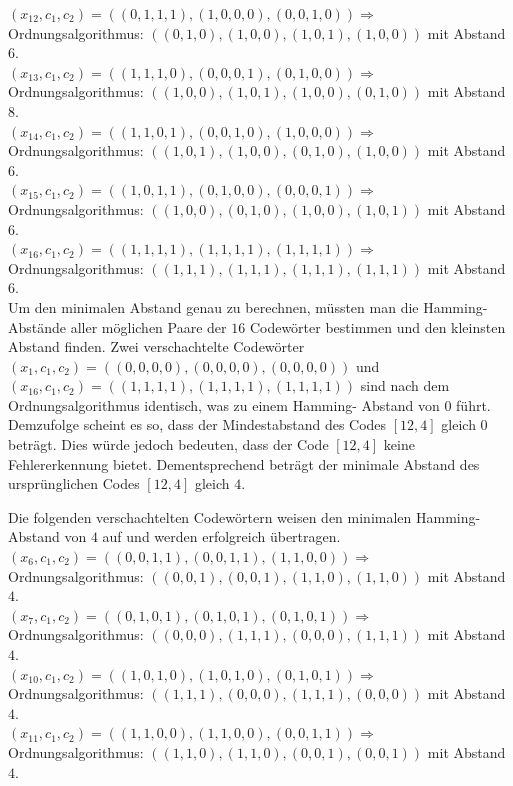 \begin{Beispiel}
    $(x_{12}, c_1, c_2) = ((0,1,1,1), (1,0,0,0), (0,0,1,0)) \Rightarrow$ Ordnungsalgorithmus: $((0,1,0),(1, 0,0),(1,0, 1),(1,0,0))$ mit Abstand $6$.\\
    
    $(x_{13}, c_1, c_2) = ((1,1,1,0), (0,0,0,1), (0,1,0,0)) \Rightarrow$ Ordnungsalgorithmus: $((1,0,0),(1, 0,1),(1,0, 0),(0,1,0))$ mit Abstand $8$.\\
    
    $(x_{14}, c_1, c_2) = ((1,1,0,1), (0,0,1,0), (1,0,0,0)) \Rightarrow$ Ordnungsalgorithmus: $((1,0,1),(1, 0,0),(0,1 ,0),(1,0,0))$ mit Abstand $6$.\\
    
    $(x_{15}, c_1, c_2) = ((1,0,1,1), (0,1,0,0), (0,0,0,1)) \Rightarrow$ Ordnungsalgorithmus: $((1,0,0),(0, 1,0),(1,0, 0),(1,0,1))$ mit Abstand $6$.\\
    
    $(x_{16}, c_1, c_2) = ((1,1,1,1), (1,1,1,1), (1,1,1,1)) \Rightarrow$ Ordnungsalgorithmus: $((1,1,1),(1, 1,1),(1,1, 1),(1,1,1))$ mit Abstand $6$.\\
    
    
    
    
    
    Um den minimalen Abstand genau zu berechnen, müssten man die Hamming-Abstände aller möglichen Paare der $16$ Codewörter bestimmen und den kleinsten Abstand finden. Zwei verschachtelte Codewörter $(x_{1}, c_1, c_2) = ((0,0,0,0), (0,0,0,0), (0,0,0,0))$ und $(x_{16}, c_1, c_2) = ((1,1,1,1), (1,1,1,1), (1,1,1,1))$ sind nach dem Ordnungsalgorithmus identisch, was zu einem Hamming- Abstand von $0$ führt. Demzufolge scheint es so, dass der Mindestabstand des Codes $[12, 4]$ gleich $0$ beträgt. Dies würde jedoch bedeuten, dass der Code $[12, 4]$ keine Fehlererkennung bietet. Dementsprechend beträgt der minimale Abstand des ursprünglichen Codes $[12, 4]$ gleich $4$.\\
    \pagebreak
    
    Die folgenden verschachtelten Codewörtern weisen den minimalen Hamming-Abstand von $4$ auf und werden erfolgreich übertragen.\\
    
    $(x_{6}, c_1, c_2) = ((0,0,1,1), (0,0,1,1), (1,1,0,0)) \Rightarrow$ Ordnungsalgorithmus: $((0,0,1),(0, 0,1),(1,1, 0),(1,1,0))$ mit Abstand $4$.\\
    
    $(x_{7}, c_1, c_2) = ((0,1,0,1), (0,1,0,1), (0,1,0,1)) \Rightarrow$ Ordnungsalgorithmus: $((0,0,0),(1, 1,1),(0,0, 0),(1,1,1))$ mit Abstand $4$.\\
    
    $(x_{10}, c_1, c_2) = ((1,0,1,0), (1,0,1,0), (0,1,0,1)) \Rightarrow$ Ordnungsalgorithmus: $((1,1,1),(0, 0,0),(1,1, 1),(0,0,0))$ mit Abstand $4$.\\
    
    $(x_{11}, c_1, c_2) = ((1,1,0,0), (1,1,0,0), (0,0,1,1)) \Rightarrow$ Ordnungsalgorithmus: $((1,1,0),(1, 1,0),(0,0, 1),(0,0,1))$ mit Abstand $4$.\\
    
\end{Beispiel}


